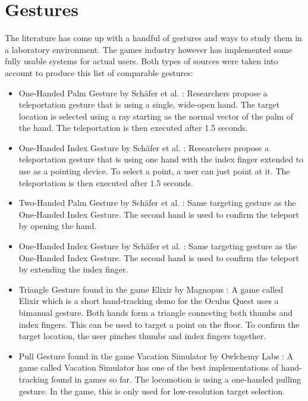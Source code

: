 \section{Gestures}
The literature has come up with a handful of gestures and ways to study them in a laboratory environment. The games industry however has implemented some fully usable systems for actual users. Both types of sources were taken into account to produce this list of comparable gestures:

\begin{itemize}
    \item One-Handed Palm Gesture by Schäfer et al. \cite{Schafer2021}:
    Researchers propose a teleportation gesture that is using a single, wide-open hand. The target location is selected using a ray starting as the normal vector of the palm of the hand. The teleportation is then executed after 1.5 seconds.

    \item One-Handed Index Gesture by Schäfer et al. \cite{Schafer2021}: 
    Researchers propose a teleportation gesture that is using one hand with the index finger extended to use as a pointing device. To select a point, a user can just point at it. The teleportation is then executed after 1.5 seconds.
    
    \item Two-Handed Palm Gesture by Schäfer et al. \cite{Schafer2021}: 
    Same targeting gesture as the One-Handed Index Gesture. The second hand is used to confirm the teleport by opening the hand.

    \item One-Handed Index Gesture by Schäfer et al. \cite{Schafer2021}: 
    Same targeting gesture as the One-Handed Index Gesture. The second hand is used to confirm the teleport by extending the index finger.

    \item Triangle Gesture found in the game Elixir by Magnopus \cite{Magnopus}:
    A game called Elixir which is a short hand-tracking demo for the Oculus Quest uses a bimanual gesture. Both hands form a triangle connecting both thumbs and index fingers. This can be used to target a point on the floor. To confirm the target location, the user pinches thumbs and index fingers together. 
    
    \item Pull Gesture found in the game Vacation Simulator by Owlchemy Labs \cite{VacSimOculus}:
    A game called Vacation Simulator has one of the best implementations of hand-tracking found in games so far. The locomotion is using a one-handed pulling gesture. In the game, this is only used for low-resolution target selection.


\end{itemize}
